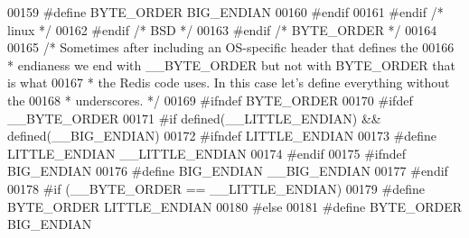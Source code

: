 \begin{DoxyCode}
00159 \textcolor{preprocessor}{#}\textcolor{preprocessor}{define} \textcolor{preprocessor}{BYTE\_ORDER}  \textcolor{preprocessor}{BIG\_ENDIAN}
00160 \textcolor{preprocessor}{#}\textcolor{preprocessor}{endif}
00161 \textcolor{preprocessor}{#}\textcolor{preprocessor}{endif} \textcolor{comment}{/* linux */}
00162 \textcolor{preprocessor}{#}\textcolor{preprocessor}{endif} \textcolor{comment}{/* BSD */}
00163 \textcolor{preprocessor}{#}\textcolor{preprocessor}{endif} \textcolor{comment}{/* BYTE\_ORDER */}
00164 
00165 \textcolor{comment}{/* Sometimes after including an OS-specific header that defines the}
00166 \textcolor{comment}{ * endianess we end with \_\_BYTE\_ORDER but not with BYTE\_ORDER that is what}
00167 \textcolor{comment}{ * the Redis code uses. In this case let's define everything without the}
00168 \textcolor{comment}{ * underscores. */}
00169 \textcolor{preprocessor}{#}\textcolor{preprocessor}{ifndef} BYTE\_ORDER
00170 \textcolor{preprocessor}{#}\textcolor{preprocessor}{ifdef} \textcolor{preprocessor}{\_\_BYTE\_ORDER}
00171 \textcolor{preprocessor}{#}\textcolor{preprocessor}{if} \textcolor{preprocessor}{defined}\textcolor{preprocessor}{(}\textcolor{preprocessor}{\_\_LITTLE\_ENDIAN}\textcolor{preprocessor}{)} \textcolor{preprocessor}{&&} \textcolor{preprocessor}{defined}\textcolor{preprocessor}{(}\textcolor{preprocessor}{\_\_BIG\_ENDIAN}\textcolor{preprocessor}{)}
00172 \textcolor{preprocessor}{#}\textcolor{preprocessor}{ifndef} \textcolor{preprocessor}{LITTLE\_ENDIAN}
00173 \textcolor{preprocessor}{#}\textcolor{preprocessor}{define} \textcolor{preprocessor}{LITTLE\_ENDIAN} \textcolor{preprocessor}{\_\_LITTLE\_ENDIAN}
00174 \textcolor{preprocessor}{#}\textcolor{preprocessor}{endif}
00175 \textcolor{preprocessor}{#}\textcolor{preprocessor}{ifndef} \textcolor{preprocessor}{BIG\_ENDIAN}
00176 \textcolor{preprocessor}{#}\textcolor{preprocessor}{define} \textcolor{preprocessor}{BIG\_ENDIAN} \textcolor{preprocessor}{\_\_BIG\_ENDIAN}
00177 \textcolor{preprocessor}{#}\textcolor{preprocessor}{endif}
00178 \textcolor{preprocessor}{#}\textcolor{preprocessor}{if} \textcolor{preprocessor}{(}\textcolor{preprocessor}{\_\_BYTE\_ORDER} \textcolor{preprocessor}{==} \textcolor{preprocessor}{\_\_LITTLE\_ENDIAN}\textcolor{preprocessor}{)}
00179 \textcolor{preprocessor}{#}\textcolor{preprocessor}{define} \textcolor{preprocessor}{BYTE\_ORDER} \textcolor{preprocessor}{LITTLE\_ENDIAN}
00180 \textcolor{preprocessor}{#}\textcolor{preprocessor}{else}
00181 \textcolor{preprocessor}{#}\textcolor{preprocessor}{define} \textcolor{preprocessor}{BYTE\_ORDER} \textcolor{preprocessor}{BIG\_ENDIAN}

\end{DoxyCode}
